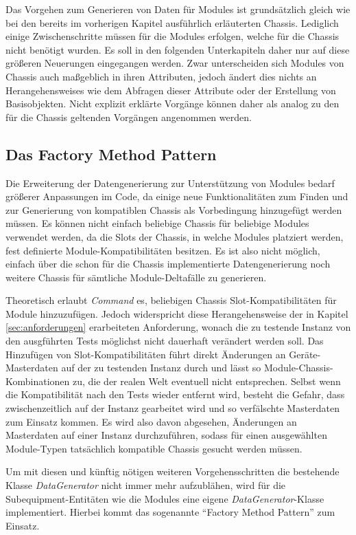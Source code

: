 Das Vorgehen zum Generieren von Daten für Modules ist grundsätzlich gleich wie bei den bereits im vorherigen Kapitel ausführlich erläuterten Chassis. Lediglich einige Zwischenschritte müssen für die Modules erfolgen, welche für die Chassis nicht benötigt wurden. Es soll in den folgenden Unterkapiteln daher nur auf diese größeren Neuerungen eingegangen werden. Zwar unterscheiden sich Modules von Chassis auch maßgeblich in ihren Attributen, jedoch ändert dies nichts an Herangehensweises wie dem Abfragen dieser Attribute oder der Erstellung von Basisobjekten. Nicht explizit erklärte Vorgänge können daher als analog zu den für die Chassis geltenden Vorgängen angenommen werden.

\subsection{Das Factory Method Pattern}\label{subsec:factoryMethod}
Die Erweiterung der Datengenerierung zur Unterstützung von Modules bedarf größerer Anpassungen im Code, da einige neue Funktionalitäten zum Finden und zur Generierung von kompatiblen Chassis als Vorbedingung hinzugefügt werden müssen. Es können nicht einfach beliebige Chassis für beliebige Modules verwendet werden, da die Slots der Chassis, in welche Modules platziert werden, fest definierte Module-Kompatibilitäten besitzen. Es ist also nicht möglich, einfach über die schon für die Chassis implementierte Datengenerierung noch weitere Chassis für sämtliche Module-Deltafälle zu generieren. 

Theoretisch erlaubt \textit{Command} es, beliebigen Chassis Slot-Kompatibilitäten für Module hinzuzufügen. Jedoch widerspricht diese Herangehensweise der in Kapitel \ref{sec:anforderungen} erarbeiteten Anforderung, wonach die zu testende Instanz von den ausgführten Tests möglichst nicht dauerhaft verändert werden soll. Das Hinzufügen von Slot-Kompatibilitäten führt direkt Änderungen an Geräte-Masterdaten auf der zu testenden Instanz durch und lässt so Module-Chassis-Kombinationen zu, die der realen Welt eventuell nicht entsprechen. Selbst wenn die Kompatibilität nach den Tests wieder entfernt wird, besteht die Gefahr, dass zwischenzeitlich auf der Instanz gearbeitet wird und so verfälschte Masterdaten zum Einsatz kommen. Es wird also davon abgesehen, Änderungen an Masterdaten auf einer Instanz durchzuführen, sodass für einen ausgewählten Module-Typen tatsächlich kompatible Chassis gesucht werden müssen.

Um mit diesen und künftig nötigen weiteren Vorgehensschritten die bestehende Klasse \textit{DataGenerator} nicht immer mehr aufzublähen, wird für die Subequipment-Entitäten wie die Modules eine eigene \textit{DataGenerator}-Klasse implementiert. Hierbei kommt das sogenannte \enquote{Factory Method Pattern} zum Einsatz.

